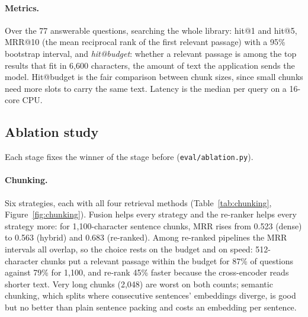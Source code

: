 \documentclass[11pt,a4paper]{article}
\newcommand{\code}[1]{\texttt{#1}}
\begin{document}
\paragraph{Metrics.} Over the 77 answerable questions, searching the whole library: hit@1 and hit@5,
MRR@10 (the mean reciprocal rank of the first relevant passage) with a 95\% bootstrap interval, and
\emph{hit@budget}: whether a relevant passage is among the top results that fit in 6,600 characters, the
amount of text the application sends the model. Hit@budget is the fair comparison between chunk sizes, since
small chunks need more slots to carry the same text. Latency is the median per query on a 16-core CPU.

\subsection{Ablation study}\label{sec:ablation}
Each stage fixes the winner of the stage before (\code{eval/ablation.py}).

\paragraph{Chunking.} Six strategies, each with all four retrieval methods (Table~\ref{tab:chunking},
Figure~\ref{fig:chunking}). Fusion helps every strategy and the re-ranker helps every strategy more:
for 1,100-character sentence chunks, MRR rises from 0.523 (dense) to 0.563 (hybrid) and 0.683 (re-ranked).
Among re-ranked pipelines the MRR intervals all overlap, so the choice rests on the budget and on speed:
512-character chunks put a relevant passage within the budget for 87\% of questions against 79\% for 1,100,
and re-rank 45\% faster because the cross-encoder reads shorter text. Very long chunks (2,048) are worst on
both counts; semantic chunking, which splits where consecutive sentences' embeddings diverge, is good but
no better than plain sentence packing and costs an embedding per sentence.
\end{document}
